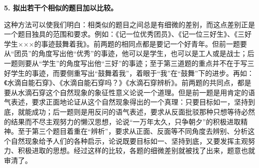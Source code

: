 \textbf{5. 拟出若干个相似的题目加以比较。}

这种方法可以使我们明白：相类似的题目之间总是有细微的差别，而这点差别正是一个题目独具的范围和要求。例如：《记一位优秀团员》、《记一位三好生》、《三好学生×××的事迹鼓舞着我》。前两题的相同点都是要记一个好青年。但前一题要从“团员”的角度写出他“优秀”的事迹，他可以是学生，也可以是工人或是战士；后一题则要从“学生”的角度写出他“三好”的事迹；至于第三道题的重点并不在于写三好学生的事迹，而要侧重写出“鼓舞着我”，着眼于“我”在“鼓舞”下的进步。再如：《水滴自能石穿》、《水滴自能石穿吗？》《水滴石穿辨析》。前两题的共同点，都是要从水滴石穿这个自然现象的象征性意义论说一个道理。但是前一题是用肯定的语气表述，要求正面地论证从这个自然现象得出的一个真理：只要目标如一，坚持到底，就能成功；后一题则是用反问的语气表述，要求从反面批驳那种只想等待必然的结果而不尽主观努力的懒汉思想，论说“一万年太久，只争朝夕”的积极进取精神。至于第三个题目着重在“辨析”，要求从正面、反面等不同角度去辨别、分析这个自然现象给予人们的各种启示，论说既要目标如一、坚持到底，又要发挥主观努力、积极进取的思想。经过这样的比较，各题的细微差别就被找了出来，题意也就审清了。
\newpage